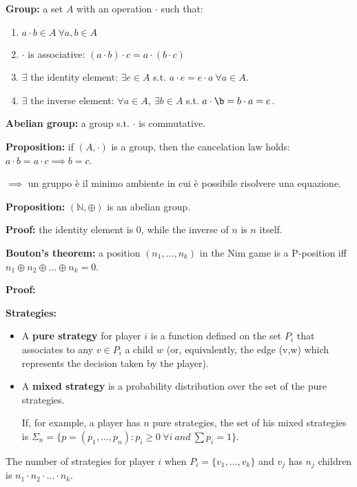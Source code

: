 \documentclass[pt11,a4paper,twoside,reqno,openright]{paper}
\begin{document}
\noindent \textbf{Group:} a set $A$ with an operation $\cdot$ such that:
\begin{enumerate}
	\item $a \cdot b \in A ~\forall a,b \in A$
	\item $\cdot$ is associative: $(a \cdot b) \cdot c = a \cdot (b \cdot c)$
	\item $\exists$ the identity element: $\exists e \in A$ s.t. 
	$a \cdot e = e \cdot a ~\forall a \in A$.
	\item $\exists$ the inverse element: $\forall a \in A, ~\exists b \in A$ 
	s.t. $a \cdot \b = b \cdot a = e$.
\end{enumerate}
\textbf{Abelian group:} a group s.t. $\cdot$ is commutative.

\noindent \textbf{Proposition:} if $(A,\cdot)$ is a group, then the cancelation 
law holds: $a \cdot b = a \cdot c \implies b = c$.

\noindent $\implies$ un gruppo è il minimo ambiente in cui è possibile risolvere 
una equazione.

\noindent \textbf{Proposition:} $(\mathbb{N},\oplus)$ is an abelian group.

\noindent \textbf{Proof:} the identity element is 0, while the inverse of $n$ 
is $n$ itself.

\bigskip
\noindent \textbf{Bouton's theorem:} a position $(n_1,...,n_k)$ in the Nim game 
is a P-position iff $n_1 \oplus n_2 \oplus ... \oplus n_k = 0$.

\noindent \textbf{Proof:}

\bigskip
\noindent \textbf{Strategies:}
\begin{itemize}
	\item A \textbf{pure strategy} for player $i$ is a function defined on the 
	set $P_i$ that associates to any $v \in P_i$ a child $w$ (or, equivalently, 
	the edge (v,w) which represents the decision taken by the player).
	\item A \textbf{mixed strategy} is a probability distribution over the set 
	of the pure strategies.

	\noindent If, for example, a player has $n$ pure strategies, the set of his 
	mixed strategies is $\Sigma_n = \{p = (p_1,...,p_n): p_i \geq 0 
	~\forall i ~and~ \sum{p_i} = 1\}$.
\end{itemize}
The number of strategies for player $i$ when $P_i = \{v_1,...,v_k\}$ and $v_j$ 
has $n_j$ children is $n_1 \cdot n_2 \cdot ... \cdot n_k$.
\end{document}
